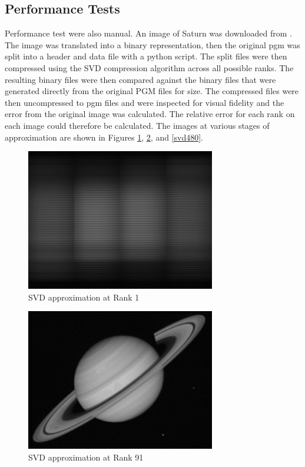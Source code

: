 \documentclass[conference]{IEEEtran}
\begin{document}
\subsection{Performance Tests}\label{perf_explanation} %
Performance test were also manual. An image of Saturn was downloaded from \cite{b2}.
The image was translated into a binary representation, then the original pgm was split 
into a header and data file with a python script. The split files were then compressed 
using the SVD compression algorithm across all possible ranks. The resulting binary 
files were then compared against the binary files that were generated directly from the 
original PGM files for size. The compressed files were then uncompressed to pgm files 
and were inspected for visual fidelity and the error from the original image was 
calculated. The relative error for each rank on each image could therefore be calculated.
The images at various stages of approximation are shown in Figures \ref{svd1}, \ref{svd91}, 
and \ref{svd480}.


\begin{figure}
	\centering
	\includegraphics[width=3.25in]{saturn_SVD_1.png}
	\caption{SVD approximation at Rank 1}
	\label{svd1}
\end{figure}

\begin{figure}
	\centering
	\includegraphics[width=3.25in]{saturn_SVD_91.png}
	\caption{SVD approximation at Rank 91}
	\label{svd91}
\end{figure}
\end{document}
